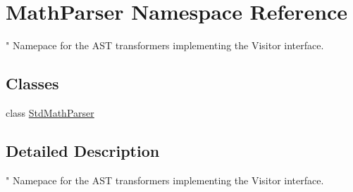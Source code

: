 \hypertarget{namespaceMathParser}{\section{Math\-Parser Namespace Reference}
\label{namespaceMathParser}
}


" Namepace for the A\-S\-T transformers implementing the Visitor interface.  


\subsection*{Classes}
\begin{DoxyCompactItemize}
\item 
class \hyperlink{classMathParser_1_1StdMathParser}{Std\-Math\-Parser}
\end{DoxyCompactItemize}


\subsection{Detailed Description}
" Namepace for the A\-S\-T transformers implementing the Visitor interface. 